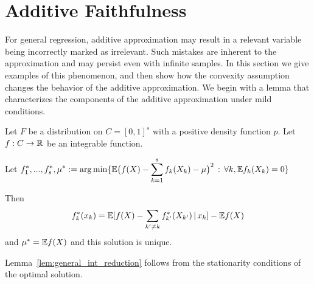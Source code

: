 
\section{Additive Faithfulness}

For general regression, additive approximation may result in a
relevant variable being incorrectly marked as irrelevant. Such
mistakes are inherent to the approximation and may persist even with
infinite samples.  In this section we give
examples of this phenomenon, and then show how the convexity
assumption
changes the behavior of the additive approximation. We begin
with a lemma that characterizes the components of the additive approximation under mild conditions.




\begin{lemma}
\label{lem:general_int_reduction}
Let $F$ be a distribution on $C=[0,1]^s$ with a positive density function $p$. Let $f: C \rightarrow {\mathbb R}$ be an integrable function. 

Let $\displaystyle f^*_1,...,f^*_s, \mu^* := 
\arg\min \{ {\mathbb E} \big( f(X) - \sum_{k=1}^s f_k(X_k) - \mu \big)^2 \,:\, \forall k, {\mathbb E} f_k(X_k) = 0\}$ 

Then 
$$ f^*_k(x_k) = {\mathbb E}[ f(X) - \sum_{k' \neq k} f^*_{k'}(X_{k'}) {\,|\,} x_k] - {\mathbb E} f(X) $$
 and $\mu^* = {\mathbb E} f(X)$ and this solution is unique.
\end{lemma}


Lemma~\ref{lem:general_int_reduction} follows from the stationarity
conditions of the optimal solution. 

